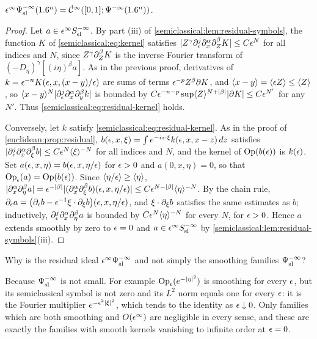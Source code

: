 \begin{lemma}\label{semiclassical:lem:residual-ideal}
  $\epsilon^\infty\Psi^{-\infty}_{\mathrm{sl}}(1.6^n)=\dot{\mathcal{C}}^\infty([0,1];\Psi^{-\infty}(1.6^n))$.
\end{lemma}
\begin{proof}
  Let $a\in\epsilon^\infty S^{-\infty}_{\mathrm{sl}}$. By part (iii) of
  \cref{semiclassical:lem:residual-symbols}, the function $K$ of \eqref{semiclassical:eq:kernel} satisfies
  $\lvert Z^\gamma\partial^j_\epsilon\partial^\alpha_x\partial^\beta_ZK\rvert\le C\epsilon^N$ for all indices and
  $N$, since $Z^\gamma\partial^\beta_ZK$ is the inverse Fourier transform of
  $(-D_\eta)^\gamma[(i\eta)^\beta a]$. As in the previous proof, derivatives of
  $k=\epsilon^{-n}K(\epsilon,x,(x-y)/\epsilon)$ are sums of terms $\epsilon^{-p}Z^\beta\partial K$,
  and $\langle x-y\rangle=\langle \epsilon Z\rangle\le\langle Z\rangle$, so $\langle x-y\rangle^N\lvert \partial^j_\epsilon\partial^\alpha_x\partial^\beta_yk\rvert$
  is bounded by $C\epsilon^{-n-p}\sup\langle Z\rangle^{N+\lvert \beta\rvert}\lvert \partial K\rvert\le C\epsilon^{N'}$ for any
  $N'$. Thus \eqref{semiclassical:eq:residual-kernel} holds.

  Conversely, let $k$ satisfy \eqref{semiclassical:eq:residual-kernel}. As in
  the proof of \cref{euclidean:prop:residual},
  $b(\epsilon,x,\xi)=\int e^{-iz\cdot\xi}k(\epsilon,x,x-z)\,dz$ satisfies
  $\lvert \partial^j_\epsilon\partial^\alpha_x\partial^\beta_\xi b\rvert\le C\epsilon^N\langle \xi\rangle^{-N}$ for all
  indices and $N$, and the kernel of $\operatorname{Op}(b(\epsilon))$ is $k(\epsilon)$. Set
  $a(\epsilon,x,\eta)=b(\epsilon,x,\eta/\epsilon)$ for $\epsilon>0$ and $a(0,x,\eta)=0$, so
  that $\operatorname{Op}_\epsilon(a)=\operatorname{Op}(b(\epsilon))$. Since $\langle \eta/\epsilon\rangle\ge\langle \eta\rangle$,
  $\lvert \partial^\alpha_x\partial^\beta_\eta a\rvert=\epsilon^{-\lvert \beta\rvert}\lvert (\partial^\alpha_x\partial^\beta_\xi b)(\epsilon,x,\eta/\epsilon)\rvert
  \le C\epsilon^{N-\lvert \beta\rvert}\langle \eta\rangle^{-N}$. By the chain rule,
  $\partial_\epsilon a=\bigl(\partial_\epsilon b-\epsilon^{-1}\xi\cdot\partial_\xi b\bigr)(\epsilon,x,\eta/\epsilon)$,
  and $\xi\cdot\partial_\xi b$ satisfies the same estimates as $b$; inductively,
  $\partial^j_\epsilon\partial^\alpha_x\partial^\beta_\eta a$ is bounded by $C\epsilon^{N}\langle \eta\rangle^{-N}$ for
  every $N$, for $\epsilon>0$. Hence $a$ extends smoothly by zero to $\epsilon=0$ and
  $a\in\epsilon^\infty S^{-\infty}_{\mathrm{sl}}$ by \cref{semiclassical:lem:residual-symbols}(iii).
\end{proof}

\begin{question}
Why is the residual ideal $\epsilon^\infty\Psi^{-\infty}_{\mathrm{sl}}$ and not simply the
smoothing families $\Psi^{-\infty}_{\mathrm{sl}}$?
\end{question}
\begin{answer}
Because $\Psi^{-\infty}_{\mathrm{sl}}$ is not small. For example
$\operatorname{Op}_\epsilon(e^{-\lvert \eta\rvert^2})$ is smoothing for every $\epsilon$, but its semiclassical
symbol is not zero and its $L^2$ norm equals one for every $\epsilon$: it is the
Fourier multiplier $e^{-\epsilon^2\lvert \xi\rvert^2}$, which tends to the identity as
$\epsilon\downarrow0$. Only families which are both smoothing and $O(\epsilon^\infty)$
are negligible in every sense, and these are exactly the families with smooth
kernels vanishing to infinite order at $\epsilon=0$.
\end{answer}

